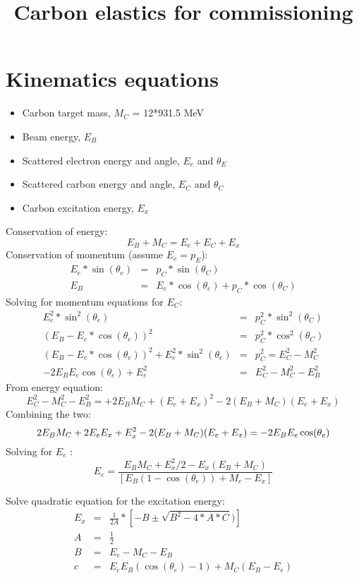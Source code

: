 \documentclass[]{article}
\title{Carbon elastics for commissioning}
\begin{document}
\maketitle


\section{Kinematics equations}
\begin{itemize}
	\item Carbon target mass, $M_C$ = 12*931.5 MeV
	\item Beam energy, $E_B$
	\item Scattered electron energy and angle, $E_e$ and $\theta_E$
	\item Scattered carbon energy and angle, $E_C$ and $\theta_C$
	\item Carbon excitation energy, $E_x$	
\end{itemize}

Conservation of energy:
\begin{equation}
E_B + M_C = E_e + E_C + E_x
\end{equation}
Conservation of momentum (assume $E_e = p_E$):
\begin{eqnarray}
E_e*\sin(\theta_e) &=& p_C*\sin(\theta_C) \\
E_B &=& E_e*\cos(\theta_e) + p_C*\cos(\theta_C) 
\end{eqnarray}
Solving for momentum equations for $E_C$:
\begin{eqnarray}
E^2_e*\sin^2(\theta_e) &=& p^2_C*\sin^2(\theta_C) \\
(E_B -E_e*\cos(\theta_e))^2 &=& p^2_C*\cos^2(\theta_C) \\
(E_B -E_e*\cos(\theta_e))^2 + E^2_e*\sin^2(\theta_e)  &=& p^2_C = E^2_C - M^2_C \\
 - 2E_BE_e\cos(\theta_e) +E^2_e&=& E^2_C - M^2_C- E^2_B
\end{eqnarray}
From energy equation:
\begin{equation}
E^2_C - M^2_C -E^2_B = +2E_BM_C + (E_e+E_x)^2 - 2(E_B+M_C)(E_e+E_x)
\end{equation}
Combining the two:
\begin{equation}
2E_BM_C +2E_eE_x+ E^2_x- 2(E_B+M_C)(E_e+E_x)= -2E_BE_e\cos(\theta_e) \\ 
\end{equation}
Solving for $E_e$ :
\begin{equation}
E_e=\frac{E_BM_C + E^2_x/2-E_x(E_B+M_C)}{[E_B(1-\cos(\theta_e))+M_c-E_x]}
\end{equation}

Solve quadratic equation for the excitation energy:
\begin{eqnarray}
E_x &=& \frac{1}{2A}*\left[-B \pm \sqrt{B^2 - 4*A*C})\right]\\
A &=& \frac{1}{2} \\
B &=& E_e -M_C - E_B  \\
c &=& E_eE_B(\cos(\theta_e)-1)+M_C(E_B-E_e)
\end{eqnarray}
\end{document}
